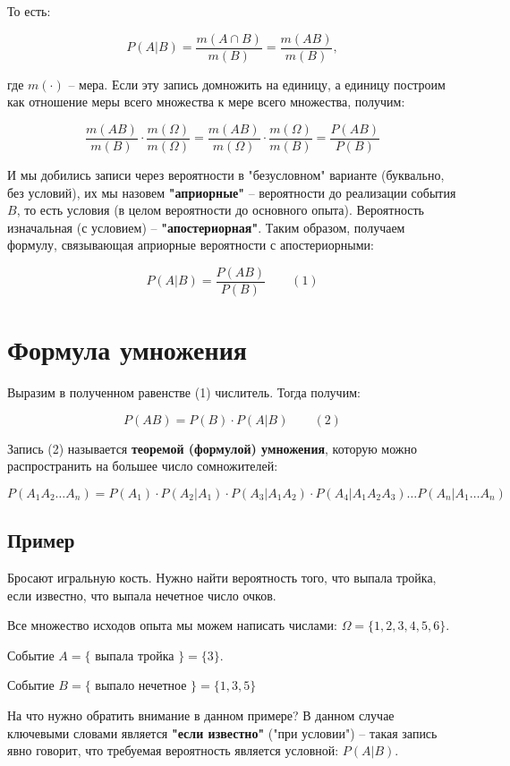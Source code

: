 \documentclass{article}
\begin{document}
То есть:

$$ P(A | B) = \frac{m(A \cap B)}{m(B)} = \frac{m(AB)}{m(B)} ,$$

где $m(\cdot)$ -- мера. Если эту запись домножить на единицу, а единицу построим как отношение меры всего множества к мере всего множества, получим:

$$ \frac{m(AB)}{m(B)}\cdot \frac{m(\Omega)}{m(\Omega)} = \frac{m(AB)}{m(\Omega)} \cdot \frac{m(\Omega)}{m(B)} = \frac{P(AB)}{P(B)}$$

И мы добились записи через вероятности в "безусловном" варианте (буквально, без условий), их мы назовем \textbf{"априорные"} -- вероятности до реализации события $B$, то есть условия (в целом вероятности до основного опыта). Вероятность изначальная (с условием) -- \textbf{"апостериорная"}. Таким образом, получаем формулу, связывающая априорные вероятности с апостериорными:

$$ P(A | B) = \frac{P(AB)}{P(B)} \qquad(1)$$ 

\section{Формула умножения}

Выразим в полученном равенстве (1) числитель. Тогда получим:

$$ P(AB) = P(B) \cdot P(A | B) \qquad (2)$$

Запись (2) называется \textbf{теоремой (формулой) умножения}, которую можно распространить на большее число сомножителей:

$$P(A_1A_2 \ldots A_n) = P(A_1) \cdot P(A_2|A_1) \cdot P(A_3|A_1A_2) \cdot P(A_4|A_1A_2A_3) \ldots P(A_n|A_1 \ldots A_n) $$

\subsection{Пример}

Бросают игральную кость. Нужно найти вероятность того, что выпала тройка, если известно, что выпала нечетное число очков.

\quad

Все множество исходов опыта мы можем написать числами: $\Omega = \{1,2,3,4,5,6\}$.

Событие $A = \{$ выпала тройка $\} = \{3\}$.

Событие $B = \{$ выпало нечетное $\} = \{1, 3, 5\}$

\quad

На что нужно обратить внимание в данном примере? В данном случае ключевыми словами является \textbf{"если известно"} ("при условии") -- такая запись явно говорит, что требуемая вероятность является условной: $P(A|B)$.
\end{document}

